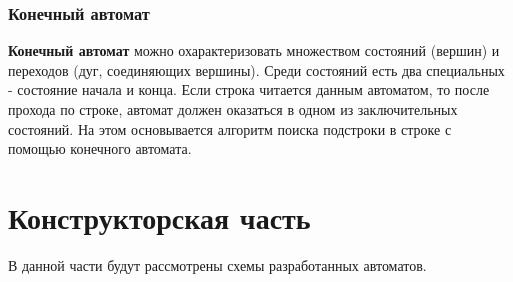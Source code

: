 \documentclass[a4paper, 14pt]{article}
\begin{document}
			\subsubsection{Конечный автомат}
			
		\textbf{Конечный автомат} можно охарактеризовать множеством состояний (вершин) и переходов (дуг, соединяющих вершины). Среди состояний есть два специальных - состояние начала и конца. Если строка читается данным автоматом, то после прохода по строке, автомат должен оказаться в одном из заключительных состояний. На этом основывается алгоритм поиска подстроки в строке с помощью конечного автомата.\\
		
		
        \section{Конструкторская часть}
        
		В данной части будут рассмотрены схемы разработанных автоматов. \\
\end{document}

